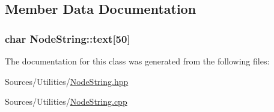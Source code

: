 \subsection{Member Data Documentation}
\hypertarget{class_node_string_a8a64f19c7c29bd0fd1c95311afe884d3}{
\subsubsection[{text}]{\setlength{\rightskip}{0pt plus 5cm}char Node\+String\+::text\mbox{[}50\mbox{]}}}\label{class_node_string_a8a64f19c7c29bd0fd1c95311afe884d3}


The documentation for this class was generated from the following files\+:\begin{DoxyCompactItemize}
\item 
Sources/\+Utilities/\hyperlink{_node_string_8hpp}{Node\+String.\+hpp}\item 
Sources/\+Utilities/\hyperlink{_node_string_8cpp}{Node\+String.\+cpp}\end{DoxyCompactItemize}
